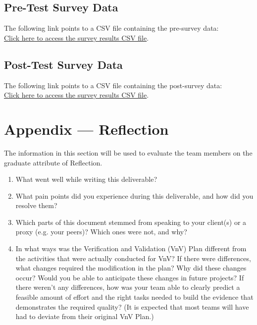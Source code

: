 \documentclass[12pt, titlepage]{article}
\begin{document}
\subsection*{Pre-Test Survey Data}
The following link points to a CSV file containing the pre-survey data:\\

\noindent
\href{run:./../Extras/UsabilityTesting/surveys/pre-test-survey-data.csv}{Click here to access the survey results CSV file}.

\subsection*{Post-Test Survey Data}
The following link points to a CSV file containing the post-survey data:\\

\noindent
\href{run:./../Extras/UsabilityTesting/surveys/post-test-survey-data.csv}{Click here to access the survey results CSV file}.

\newpage{}
\section*{Appendix --- Reflection}

The information in this section will be used to evaluate the team members on the
graduate attribute of Reflection.



\begin{enumerate}
  \item What went well while writing this deliverable? 
  \item What pain points did you experience during this deliverable, and how
    did you resolve them?
  \item Which parts of this document stemmed from speaking to your client(s) or
  a proxy (e.g. your peers)? Which ones were not, and why?
  \item In what ways was the Verification and Validation (VnV) Plan different
  from the activities that were actually conducted for VnV?  If there were
  differences, what changes required the modification in the plan?  Why did
  these changes occur?  Would you be able to anticipate these changes in future
  projects?  If there weren't any differences, how was your team able to clearly
  predict a feasible amount of effort and the right tasks needed to build the
  evidence that demonstrates the required quality?  (It is expected that most
  teams will have had to deviate from their original VnV Plan.)
\end{enumerate}
\end{document}
